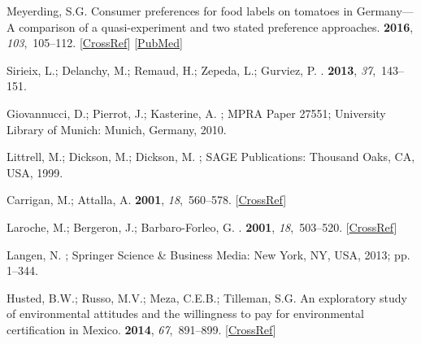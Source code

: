 \documentclass[sustainability,article,accept,moreauthors,pdftex,10pt,a4paper]{Definitions/mdpi}
\theoremstyle{mdpi}
\newcounter{ex}
\newcounter{re}
\theoremstyle{mdpidefinition}
\begin{document}
{\begin{thebibliography}{999}
Meyerding, S.G.
\newblock Consumer preferences for food labels on tomatoes in Germany---A
comparison of a quasi-experiment and two stated preference approaches.
 {\bf 2016}, {\em 103},~105--112. [\href{http://dx.doi.org/10.1016/j.appet.2016.03.025}{CrossRef}] [\href{http://www.ncbi.nlm.nih.gov/pubmed/27037221}{PubMed}]


Sirieix, L.; Delanchy, M.; Remaud, H.; Zepeda, L.; Gurviez, P.
.
 {\bf 2013}, {\em
37},~143--151.

Giovannucci, D.; Pierrot, J.; Kasterine, A.
;
\newblock MPRA Paper 27551; University Library of Munich:  Munich, Germany,  2010.

Littrell, M.; Dickson, M.; Dickson, M.
; SAGE Publications:  Thousand Oaks, CA, USA, 1999.

Carrigan, M.; Attalla, A.
 {\bf 2001}, {\em 18},~560--578. [\href{http://dx.doi.org/10.1108/07363760110410263}{CrossRef}]

Laroche, M.; Bergeron, J.; Barbaro-Forleo, G.
.
 {\bf 2001}, {\em 18},~503--520. [\href{http://dx.doi.org/10.1108/EUM0000000006155}{CrossRef}]

Langen, N.
; Springer Science \& Business Media: New York, NY,  USA,
2013; pp. 1--344.

Husted, B.W.; Russo, M.V.; Meza, C.E.B.; Tilleman, S.G.
\newblock An exploratory study of environmental attitudes and the willingness
to pay for environmental certification in Mexico.
 {\bf 2014}, {\em 67},~891--899. [\href{http://dx.doi.org/10.1016/j.jbusres.2013.07.008}{CrossRef}]


\end{thebibliography}}
\end{document}
